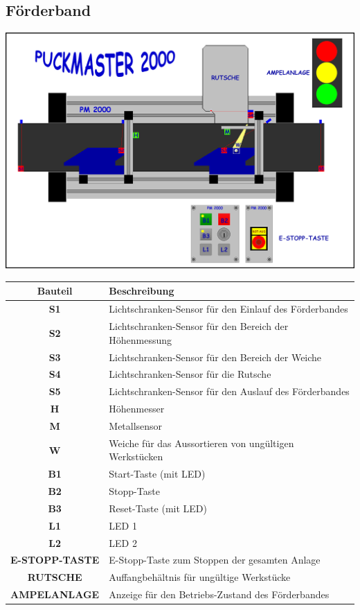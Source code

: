 \documentclass[oneside,a4paper,titlepage]{scrartcl} %
\begin{document}
\subsection{Förderband}
\includegraphics[scale=0.86]{imgs/PUCKMASTER_2000.png}
\newline
\newline
\begin{small}
  \begin{tabular}{|c|L{10.5cm}|}
    \hline
    \textbf{Bauteil} & \textbf{Beschreibung}\\
    \hline
    \textbf{S1} & Lichtschranken-Sensor für den Einlauf des Förderbandes\\
    \hline
    \textbf{S2} & Lichtschranken-Sensor für den Bereich der Höhenmessung\\
    \hline
    \textbf{S3} & Lichtschranken-Sensor für den Bereich der Weiche\\
    \hline
    \textbf{S4} & Lichtschranken-Sensor für die Rutsche\\
    \hline
    \textbf{S5} & Lichtschranken-Sensor für den Auslauf des Förderbandes\\
    \hline
    \textbf{H} & Höhenmesser\\
    \hline
    \textbf{M} & Metallsensor\\
    \hline
    \textbf{W} & Weiche für das Aussortieren von ungültigen Werkstücken\\
    \hline
    \textbf{B1} & Start-Taste (mit LED)\\
    \hline
    \textbf{B2} & Stopp-Taste\\
    \hline
    \textbf{B3} & Reset-Taste (mit LED)\\
    \hline
    \textbf{L1} & LED 1\\
    \hline
    \textbf{L2} & LED 2\\
    \hline
    \textbf{E-STOPP-TASTE} & E-Stopp-Taste zum Stoppen der gesamten Anlage\\
    \hline
    \textbf{RUTSCHE} & Auffangbehältnis für ungültige Werkstücke\\
    \hline
    \textbf{AMPELANLAGE} & Anzeige für den Betriebs-Zustand des Förderbandes\\
    \hline
  \end{tabular}
\end{small}
\end{document}
